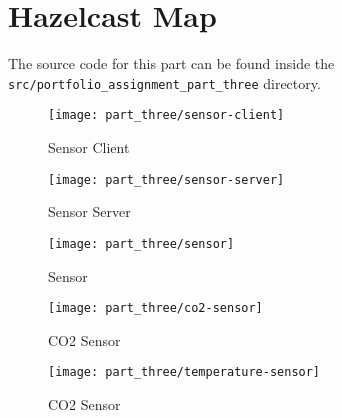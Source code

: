 \section{Hazelcast Map}
The source code for this part can be found inside the
\small\texttt{src/portfolio\_assignment\_part\_three}
\normalsize directory.

\begin{figure}
\caption{Sensor Client}
\centering
\texttt{[image: part\_three/sensor-client]}
\end{figure}

\begin{figure}
\caption{Sensor Server}
\centering
\texttt{[image: part\_three/sensor-server]}
\end{figure}

\begin{figure}
\caption{Sensor}
\centering
\texttt{[image: part\_three/sensor]}
\end{figure}

\begin{figure}
\caption{CO2 Sensor}
\centering
\texttt{[image: part\_three/co2-sensor]}
\end{figure}

\begin{figure}
\caption{CO2 Sensor}
\centering
\texttt{[image: part\_three/temperature-sensor]}
\end{figure}

